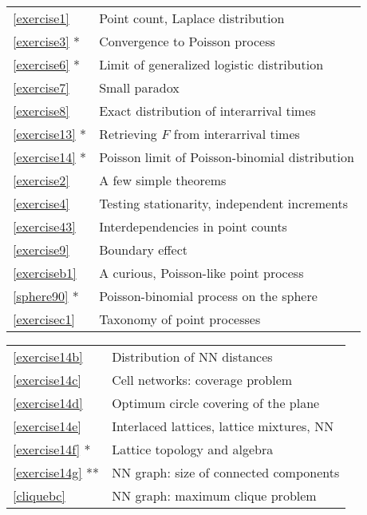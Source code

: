 \documentclass[10pt]{article}
\begin{document}
\begin{table}[H]
    \begin{minipage}{.5\linewidth}
      \centering
        \begin{tabular}{ll}
   \ref{exercise1} & Point count, Laplace distribution   \\
   \ref{exercise3} * & Convergence to Poisson process   \\
   \ref{exercise6} * & Limit of generalized logistic distribution\\
   \ref{exercise7} & Small paradox \\
   \ref{exercise8} & Exact distribution of interarrival times \\
   \ref{exercise13} * & Retrieving $F$ from interarrival times\\
   \ref{exercise14} * & Poisson limit of Poisson-binomial distribution\\
   \ref{exercise2} &  A few simple theorems  \\
   \ref{exercise4}  & Testing stationarity, independent increments  \\
   \ref{exercise43}  & Interdependencies in point counts \\
   \ref{exercise9} & Boundary effect \\
   \ref{exerciseb1} & A curious, Poisson-like point process \\
   \ref{sphere90} * & Poisson-binomial process on the sphere \\
   \ref{exercisec1} & Taxonomy of point processes
        \end{tabular}
    \end{minipage}%
    \begin{minipage}{.5\linewidth}
      \centering
        \begin{tabular}{ll}
   \ref{exercise14b} & Distribution of NN distances \\
   \ref{exercise14c} & Cell networks: coverage problem \\
   \ref{exercise14d} & Optimum circle covering of the plane \\
   \ref{exercise14e} & Interlaced lattices, lattice mixtures, NN\\
   \ref{exercise14f} * & Lattice topology and algebra\\
   \ref{exercise14g} ** & NN graph: size of connected components\\
   \ref{cliquebc} & NN graph: maximum clique problem\\

\end{tabular}
\end{minipage}
\end{table}
\end{document}
